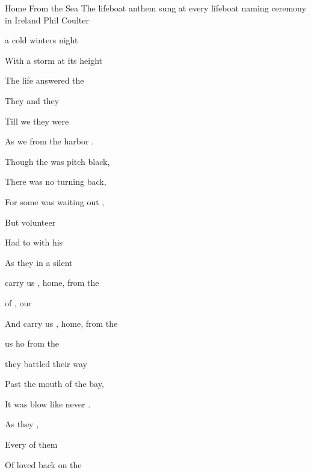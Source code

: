 \begin{SBSong}{Home From the Sea}
  {The lifeboat anthem sung at every lifeboat naming ceremony in Ireland}
  {Phil Coulter}
  \begin{SBVerse}
     a cold winters night 

    With a storm at its height

    The life answered the  

    They  and they  

    Till we  they were  

    As we  from the harbor . 

    Though the  was pitch black, 

    There was no turning back,

    For some was waiting out  , 

    But  volunteer

    Had to   with his  

    As they   in a silent  
  \end{SBVerse}
  \begin{SBChorus}

     carry us  , home,   from the  
    
     of ,  our   

    And carry us  , home,   from the   

     us  ho from the   
  \end{SBChorus}
  \CBPageBrk
  \begin{SBVerse}
     they battled their way
    
    Past the mouth of the bay,
    
    It was blow like never .

    As they  ,

    Every  of them 

    Of loved  back on the 


\end{SBVerse}
\end{SBSong}
